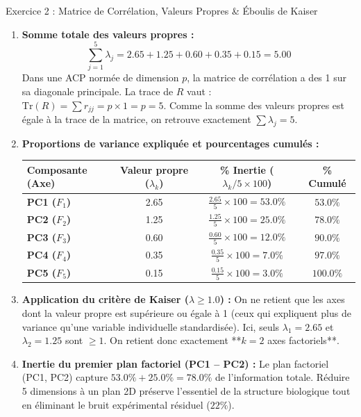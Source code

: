 \documentclass[11pt,a4paper]{article}
\begin{document}
\begin{solutionbox}{Exercice 2 : Matrice de Corrélation, Valeurs Propres \& Éboulis de Kaiser}
\begin{enumerate}[label=\textbf{\alph*.}]
  \item \textbf{Somme totale des valeurs propres :}
  \begin{equation*}
    \sum_{j=1}^5 \lambda_j = 2.65 + 1.25 + 0.60 + 0.35 + 0.15 = \mathbf{5.00}
  \end{equation*}
  Dans une ACP normée de dimension $p$, la matrice de corrélation a des 1 sur sa diagonale principale. La trace de $R$ vaut : $\text{Tr}(R) = \sum r_{jj} = p \times 1 = p = 5$. Comme la somme des valeurs propres est égale à la trace de la matrice, on retrouve exactement $\sum \lambda_j = 5$.

  \item \textbf{Proportions de variance expliquée et pourcentages cumulés :}
  \begin{center}
    \small
    \begin{tabular}{lccc}
      \toprule
      \textbf{Composante (Axe)} & \textbf{Valeur propre ($\lambda_k$)} & \textbf{\% Inertie ($\lambda_k / 5 \times 100$)} & \textbf{\% Cumulé} \\
      \midrule
      \textbf{PC1 ($F_1$)} & 2.65 & $\frac{2.65}{5} \times 100 = \mathbf{53.0\%}$ & $53.0\%$ \\
      \textbf{PC2 ($F_2$)} & 1.25 & $\frac{1.25}{5} \times 100 = \mathbf{25.0\%}$ & $\mathbf{78.0\%}$ \\
      \textbf{PC3 ($F_3$)} & 0.60 & $\frac{0.60}{5} \times 100 = 12.0\%$ & $90.0\%$ \\
      \textbf{PC4 ($F_4$)} & 0.35 & $\frac{0.35}{5} \times 100 = 7.0\%$  & $97.0\%$ \\
      \textbf{PC5 ($F_5$)} & 0.15 & $\frac{0.15}{5} \times 100 = 3.0\%$  & $100.0\%$ \\
      \bottomrule
    \end{tabular}
  \end{center}

  \item \textbf{Application du critère de Kaiser ($\lambda \ge 1.0$) :}
  On ne retient que les axes dont la valeur propre est supérieure ou égale à 1 (ceux qui expliquent plus de variance qu'une variable individuelle standardisée).
  Ici, seuls $\lambda_1 = 2.65$ et $\lambda_2 = 1.25$ sont $\ge 1$. On retient donc exactement **$k = 2$ axes factoriels**.

  \item \textbf{Inertie du premier plan factoriel (PC1 -- PC2) :}
  Le plan factoriel (PC1, PC2) capture $53.0\% + 25.0\% = \mathbf{78.0\%}$ de l'information totale. Réduire 5 dimensions à un plan 2D préserve l'essentiel de la structure biologique tout en éliminant le bruit expérimental résiduel ($22\%$).
\end{enumerate}
\end{solutionbox}
\end{document}
